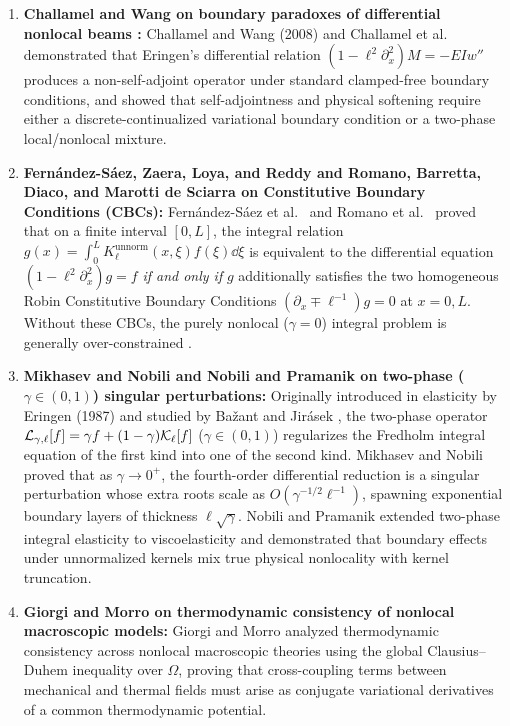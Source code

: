 \begin{enumerate}[leftmargin=*,align=left]
  \item \textbf{Challamel and Wang on boundary paradoxes of differential nonlocal beams \cite{ChallamelWang2014}:} Challamel and Wang (2008) and Challamel et al.\ \cite{ChallamelWang2014} demonstrated that Eringen's differential relation $(1 - \ell^2\partial_x^2)M = -EIw''$ produces a non-self-adjoint operator under standard clamped-free boundary conditions, and showed that self-adjointness and physical softening require either a discrete-continualized variational boundary condition or a two-phase local/nonlocal mixture.

  \item \textbf{Fern{\'a}ndez-S{\'a}ez, Zaera, Loya, and Reddy \cite{FernandezSaez2016,FernandezSaezZaera2017} and Romano, Barretta, Diaco, and Marotti de Sciarra \cite{Romano2017} on Constitutive Boundary Conditions (CBCs):} Fern{\'a}ndez-S{\'a}ez et al.\ \cite{FernandezSaez2016,FernandezSaezZaera2017} and Romano et al.\ \cite{Romano2017} proved that on a finite interval $[0,L]$, the integral relation $g(x) = \int_0^L K_\ell^{\mathrm{unnorm}}(x,\xi)f(\xi)\dd\xi$ is equivalent to the differential equation $(1-\ell^2\partial_x^2)g = f$ \emph{if and only if} $g$ additionally satisfies the two homogeneous Robin Constitutive Boundary Conditions $(\partial_x \mp \ell^{-1})g = 0$ at $x=0,L$. Without these CBCs, the purely nonlocal ($\gamma = 0$) integral problem is generally over-constrained \cite{Romano2017}.

  \item \textbf{Mikhasev and Nobili \cite{MikhasevNobili2020} and Nobili and Pramanik \cite{NobiliPramanik2025a,NobiliPramanik2025b} on two-phase ($\gamma \in (0,1)$) singular perturbations:} Originally introduced in elasticity by Eringen (1987) and studied by Ba{\v z}ant and Jirásek \cite{BazantJirasek2002}, the two-phase operator $\mathcal{L}_{\gamma,\ell}[f] = \gamma f + (1-\gamma)\mathcal{K}_\ell[f]$ ($\gamma \in (0,1)$) regularizes the Fredholm integral equation of the first kind into one of the second kind. Mikhasev and Nobili \cite{MikhasevNobili2020} proved that as $\gamma \to 0^+$, the fourth-order differential reduction is a singular perturbation whose extra roots scale as $O(\gamma^{-1/2}\ell^{-1})$, spawning exponential boundary layers of thickness $\ell\sqrt{\gamma}$. Nobili and Pramanik \cite{NobiliPramanik2025a,NobiliPramanik2025b} extended two-phase integral elasticity to viscoelasticity and demonstrated that boundary effects under unnormalized kernels mix true physical nonlocality with kernel truncation.

  \item \textbf{Giorgi and Morro \cite{GiorgiMorro2025} on thermodynamic consistency of nonlocal macroscopic models:} Giorgi and Morro \cite{GiorgiMorro2025} analyzed thermodynamic consistency across nonlocal macroscopic theories using the global Clausius--Duhem inequality over $\Omega$, proving that cross-coupling terms between mechanical and thermal fields must arise as conjugate variational derivatives of a common thermodynamic potential.
\end{enumerate}


